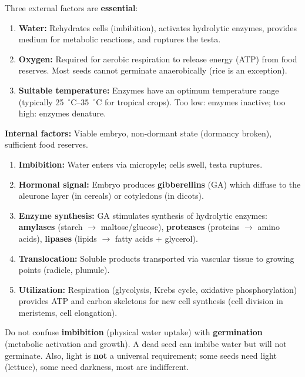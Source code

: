 \documentclass[11pt]{article}
\begin{document}
\begin{propriete}
Three external factors are \textbf{essential}:
\begin{enumerate}
\item \textbf{Water:} Rehydrates cells (imbibition), activates hydrolytic enzymes, provides medium for metabolic reactions, and ruptures the testa.
\item \textbf{Oxygen:} Required for aerobic respiration to release energy (ATP) from food reserves. Most seeds cannot germinate anaerobically (rice is an exception).
\item \textbf{Suitable temperature:} Enzymes have an optimum temperature range (typically \SI{25}{\ensuremath{{}^{\circ}\mathrm{C}}}--\SI{35}{\ensuremath{{}^{\circ}\mathrm{C}}} for tropical crops). Too low: enzymes inactive; too high: enzymes denature.
\end{enumerate}
\textbf{Internal factors:} Viable embryo, non-dormant state (dormancy broken), sufficient food reserves.
\end{propriete}

\begin{methode}
\begin{enumerate}
\item \textbf{Imbibition:} Water enters via micropyle; cells swell, testa ruptures.
\item \textbf{Hormonal signal:} Embryo produces \textbf{gibberellins} (GA) which diffuse to the aleurone layer (in cereals) or cotyledons (in dicots).
\item \textbf{Enzyme synthesis:} GA stimulates synthesis of hydrolytic enzymes: \textbf{amylases} (starch $\to$ maltose/glucose), \textbf{proteases} (proteins $\to$ amino acids), \textbf{lipases} (lipids $\to$ fatty acids + glycerol).
\item \textbf{Translocation:} Soluble products transported via vascular tissue to growing points (radicle, plumule).
\item \textbf{Utilization:} Respiration (glycolysis, Krebs cycle, oxidative phosphorylation) provides ATP and carbon skeletons for new cell synthesis (cell division in meristems, cell elongation).
\end{enumerate}
\end{methode}

\begin{attention}
Do not confuse \textbf{imbibition} (physical water uptake) with \textbf{germination} (metabolic activation and growth). A dead seed can imbibe water but will not germinate. Also, light is \textbf{not} a universal requirement; some seeds need light (lettuce), some need darkness, most are indifferent.
\end{attention}
\end{document}
